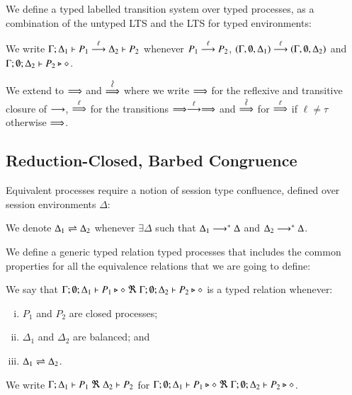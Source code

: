 We define a typed labelled transition system over typed processes,
as a combination of the untyped LTS and the LTS for typed environments:

\begin{definition}\label{d:tlts}\rm
	\label{def:typed_transition}
	We write
	$\Gamma; \Delta_1 \vdash P_1 \stackrel{\ell}{\longrightarrow} \Delta_2 \vdash P_2$
	whenever
	$P_1 \stackrel{\ell}{\longrightarrow} P_2$,
	$(\Gamma, \emptyset, \Delta_1) \stackrel{\ell}{\longrightarrow} (\Gamma, \emptyset, \Delta_2)$
	and $\Gamma; \emptyset; \Delta_2 \vdash P_2 \triangleright \diamond$.

	We extend to $\stackrel{}{\Longrightarrow}$ 
	and $\stackrel{\hat{\ell}}{\Longrightarrow}$ 
	where we write 
	$\stackrel{}{\Longrightarrow}$ for the reflexive and
	transitive closure of $\stackrel{}{\longrightarrow}$, $\stackrel{\ell}{\Longrightarrow}$ for the transitions
	$\stackrel{}{\Longrightarrow}\stackrel{\ell}{\longrightarrow}\stackrel{}{\Longrightarrow}$ and $\stackrel{\hat{\ell}}{\Longrightarrow}$ for $\stackrel{\ell}{\Longrightarrow}$ if
	$\ell\not = \tau$ otherwise $\stackrel{}{\Longrightarrow}$.
\end{definition}


\subsection{Reduction-Closed, Barbed Congruence}
\label{subsec:rc}

Equivalent processes require a notion of session type confluence,
defined over session environments $\Delta$:
%
\begin{definition}\rm
	We denote $\Delta_1 \rightleftharpoons \Delta_2$ whenever $\exists \Delta$ such that
	$\Delta_1 \longrightarrow^* \Delta$ and $\Delta_2 \longrightarrow^* \Delta$.
\end{definition}
%

We define a generic typed relation typed processes that
includes the common properties for all the equivalence relations
that we are going to define:
%
\begin{definition}\rm
	We say that
	$\Gamma; \emptyset; \Delta_1 \vdash P_1 \triangleright \diamond\ \Re \ \Gamma; \emptyset; \Delta_2 \vdash P_2 \triangleright \diamond$
	is a typed relation whenever:
	\begin{enumerate}[i)]
		\item	$P_1$ and $P_2$ are closed processes;
		\item	$\Delta_1$ and $\Delta_2$ are balanced; and
		\item	$\Delta_1 \rightleftharpoons \Delta_2$.
	\end{enumerate}
%
	\noi We write
	$\horel{\Gamma}{\Delta_1}{P_1}{\ \Re\ }{\Delta_2}{P_2}$
	for $\Gamma; \emptyset; \Delta_1 \vdash P_1 \triangleright \diamond\ \Re\ \Gamma; \emptyset; \Delta_2 \vdash P_2 \triangleright \diamond$.
\end{definition}

